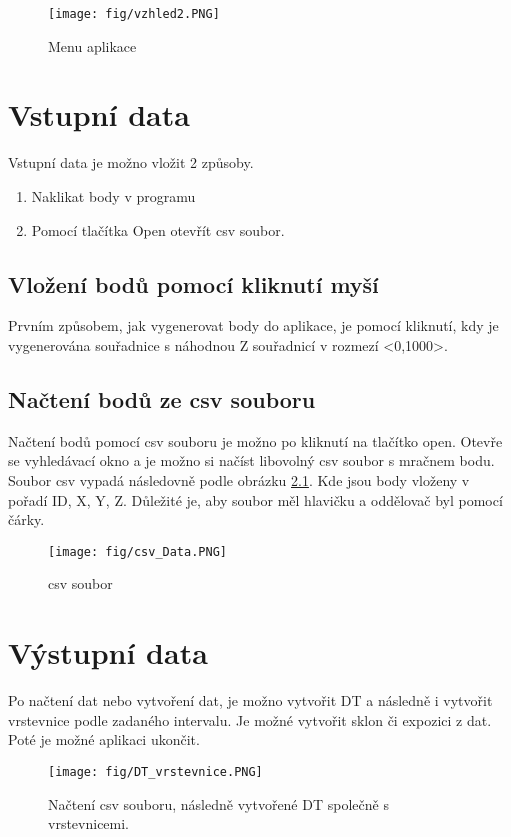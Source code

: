 \documentclass[oneside,12pt,a4paper]{book}
\begin{document}
\begin{figure}[ht!]
    \centering
    \texttt{[image: fig/vzhled2.PNG]}
    \caption{Menu aplikace}
    \label{fig:Zadání úlohy22}
\end{figure}

\chapter{Vstupní data} 
Vstupní data je možno vložit 2 způsoby. 
\begin{enumerate}
    \item Naklikat body v programu
    \item Pomocí tlačítka Open otevřít csv soubor.
\end{enumerate}

\section{Vložení bodů pomocí kliknutí myší}

Prvním způsobem, jak vygenerovat body do aplikace, je pomocí kliknutí, kdy je vygenerována souřadnice s náhodnou Z souřadnicí v rozmezí <0,1000>.

\section{Načtení bodů ze csv souboru}
Načtení bodů pomocí csv souboru je možno po kliknutí na tlačítko open. Otevře se vyhledávací okno a je možno si načíst libovolný csv soubor s mračnem bodu. Soubor csv vypadá následovně podle obrázku \ref{fig:csv}. Kde jsou body vloženy v pořadí ID, X, Y, Z. Důležité je, aby soubor měl hlavičku a oddělovač byl pomocí čárky.

\begin{figure}[ht!]
    \centering
    \texttt{[image: fig/csv\_Data.PNG]}
    \caption{csv soubor}
    \label{fig:csv}
\end{figure}

\chapter{Výstupní data} 
Po načtení dat nebo vytvoření dat, je možno vytvořit DT a následně i vytvořit vrstevnice podle zadaného intervalu. Je možné vytvořit sklon či expozici z dat. Poté je možné aplikaci ukončit.

\begin{figure}[ht!]
    \centering
    \texttt{[image: fig/DT\_vrstevnice.PNG]}
    \caption{Načtení csv souboru, následně vytvořené DT společně s vrstevnicemi.}
    \label{fig:csv}
\end{figure}
\end{document}
